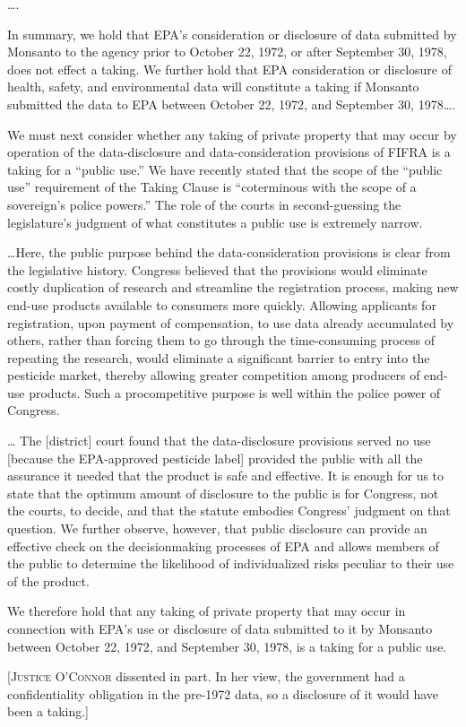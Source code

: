 \ldots.

In summary, we hold that EPA's consideration or disclosure of data submitted by
Monsanto to the agency prior to October 22, 1972, or after September 30, 1978,
does not effect a taking. We further hold that EPA consideration or disclosure
of health, safety, and environmental data will constitute a taking if Monsanto
submitted the data to EPA between October 22, 1972, and September 30,
1978\ldots.




We must next consider whether any taking of private property that may occur by
operation of the data-disclosure and data-consideration provisions of FIFRA is a
taking for a ``public use.'' We have recently stated that the scope of the
``public use'' requirement of the Taking Clause is ``coterminous with the scope
of a sovereign's police powers.''
The role of the courts in second-guessing the legislature's
judgment of what constitutes a public use is extremely narrow.

\ldots Here, the public purpose behind the data-consideration provisions
is clear from  the legislative history. Congress believed that the provisions
would eliminate costly duplication of research and streamline the registration
process, making new end-use products available to consumers more quickly.
Allowing applicants for registration, upon payment of compensation, to use data
already accumulated by others, rather than forcing them to go through the
time-consuming process of repeating the research, would eliminate a significant
barrier to entry into the pesticide market, thereby allowing greater competition
among producers of end-use products. Such a procompetitive
purpose is well within the police power of Congress.

\ldots
The [district] court found that the
data-disclosure provisions served no use [because the EPA-approved pesticide
label] provided the public with all the assurance
it needed that the product is safe and effective.
It is enough for us to state that the optimum amount of disclosure to the
public is for Congress, not the courts, to decide, and that the statute embodies
Congress' judgment on that question.
We further observe, however, that public disclosure can provide an
effective check on the decisionmaking processes of EPA and allows members of the
public to determine the likelihood of individualized risks peculiar to their use
of the product.

We therefore hold that any taking of private property that may occur in
connection with EPA's use or disclosure of data submitted to it by Monsanto
between October 22, 1972, and September 30, 1978, is a taking for a public use.

[\textsc{Justice O'Connor} dissented in part. In her view, the government had a
confidentiality obligation in the pre-1972 data, so a disclosure of it would
have been a taking.]

